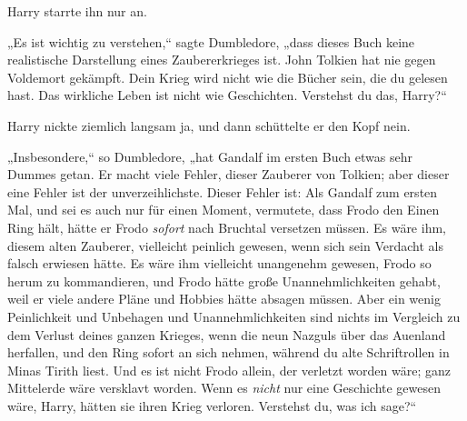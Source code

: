 Harry starrte ihn nur an.

„Es ist wichtig zu verstehen,“ sagte Dumbledore, „dass dieses Buch keine realistische Darstellung eines Zaubererkrieges ist. John Tolkien hat nie gegen Voldemort gekämpft. Dein Krieg wird nicht wie die Bücher sein, die du gelesen hast. Das wirkliche Leben ist nicht wie Geschichten. Verstehst du das, Harry?“

Harry nickte ziemlich langsam ja, und dann schüttelte er den Kopf nein.

„Insbesondere,“ so Dumbledore, „hat Gandalf im ersten Buch etwas sehr Dummes getan. Er macht viele Fehler, dieser Zauberer von Tolkien; aber dieser eine Fehler ist der unverzeihlichste. Dieser Fehler ist: Als Gandalf zum ersten Mal, und sei es auch nur für einen Moment, vermutete, dass Frodo den Einen Ring hält, hätte er Frodo \emph{sofort} nach Bruchtal versetzen müssen. Es wäre ihm, diesem alten Zauberer, vielleicht peinlich gewesen, wenn sich sein Verdacht als falsch erwiesen hätte. Es wäre ihm vielleicht unangenehm gewesen, Frodo so herum zu kommandieren, und Frodo hätte große Unannehmlichkeiten gehabt, weil er viele andere Pläne und Hobbies hätte absagen müssen. Aber ein wenig Peinlichkeit und Unbehagen und Unannehmlichkeiten sind nichts im Vergleich zu dem Verlust deines ganzen Krieges, wenn die neun Nazguls über das Auenland herfallen, und den Ring sofort an sich nehmen, während du alte Schriftrollen in Minas Tirith liest. Und es ist nicht Frodo allein, der verletzt worden wäre; ganz Mittelerde wäre versklavt worden. Wenn es \emph{nicht} nur eine Geschichte gewesen wäre, Harry, hätten sie ihren Krieg verloren. Verstehst du, was ich sage?“

